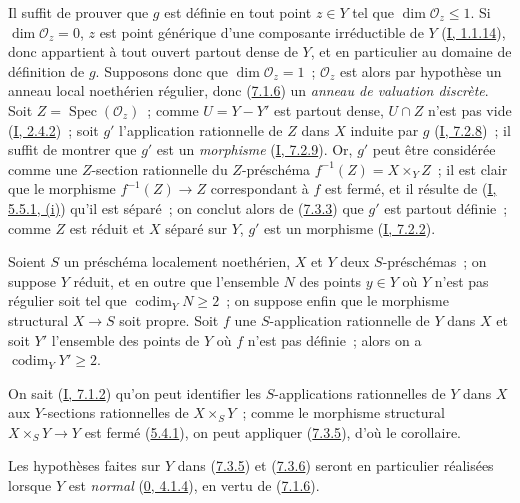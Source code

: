 Il suffit de prouver que $g$ est définie en tout point $z\in Y$ tel que
$\dim\mathcal{O}_z\leq1$. Si $\dim\mathcal{O}_z=0$, $z$ est point générique
d'une composante irréductible de $Y$ (\hyperref[I.1.1.14-fr]{I, 1.1.14}), donc
appartient à tout ouvert partout dense de $Y$, et en particulier au domaine de
définition de $g$. Supposons donc que $\dim\mathcal{O}_z=1$~;
$\mathcal{O}_z$ est alors par hypothèse un anneau local noethérien régulier,
donc (\hyperref[II.7.1.6-fr]{7.1.6}) un \emph{anneau de valuation discrète}.
Soit $Z=\operatorname{Spec}(\mathcal{O}_z)$~; comme $U=Y-Y'$ est partout
dense, $U\cap Z$ n'est pas vide (\hyperref[I.2.4.2-fr]{I, 2.4.2})~; soit $g'$
l'application rationnelle de $Z$ dans $X$ induite par $g$
(\hyperref[I.7.2.8-fr]{I, 7.2.8})~; il suffit de montrer que $g'$ est un
\emph{morphisme} (\hyperref[I.7.2.9-fr]{I, 7.2.9}). Or, $g'$ peut être
considérée comme une $Z$-section rationnelle du $Z$-préschéma
$f^{-1}(Z)=X\times_YZ$~; il est clair que le morphisme $f^{-1}(Z)\to Z$
correspondant à $f$ est fermé, et il résulte de
(\hyperref[I.5.5.1-fr]{I, 5.5.1, (i)}) qu'il est séparé~; on conclut alors de
(\hyperref[II.7.3.3-fr]{7.3.3}) que $g'$ est partout définie~; comme $Z$ est
réduit et $X$ séparé sur $Y$, $g'$ est un morphisme
(\hyperref[I.7.2.2-fr]{I, 7.2.2}).

\begin{corollary}[7.3.6]
\label{II.7.3.6-fr}
Soient $S$ un préschéma localement noethérien, $X$ et $Y$ deux
$S$-préschémas~; on suppose $Y$ réduit, et en outre que l'ensemble $N$ des
points $y\in Y$ où $Y$ n'est pas régulier soit tel que
$\operatorname{codim}_YN\geq2$~; on suppose enfin que le morphisme structural
$X\to S$ soit propre. Soit $f$ une $S$-application rationnelle de $Y$ dans
$X$ et soit $Y'$ l'ensemble des points de $Y$ où $f$ n'est pas définie~;
alors on a $\operatorname{codim}_YY'\geq2$.
\end{corollary}

On sait (\hyperref[I.7.1.2-fr]{I, 7.1.2}) qu'on peut identifier les
$S$-applications rationnelles de $Y$ dans $X$ aux $Y$-sections rationnelles
de $X\times_SY$~; comme le morphisme structural $X\times_SY\to Y$ est fermé
(\hyperref[II.5.4.1-fr]{5.4.1}), on peut appliquer
(\hyperref[II.7.3.5-fr]{7.3.5}), d'où le corollaire.

\begin{remark}[7.3.7]
\label{II.7.3.7-fr}
Les hypothèses faites sur $Y$ dans (\hyperref[II.7.3.5-fr]{7.3.5}) et
(\hyperref[II.7.3.6-fr]{7.3.6}) seront en particulier réalisées lorsque $Y$
est \emph{normal} (\hyperref[0.4.1.4-fr]{0, 4.1.4}), en vertu de
(\hyperref[II.7.1.6-fr]{7.1.6}).
\end{remark}

